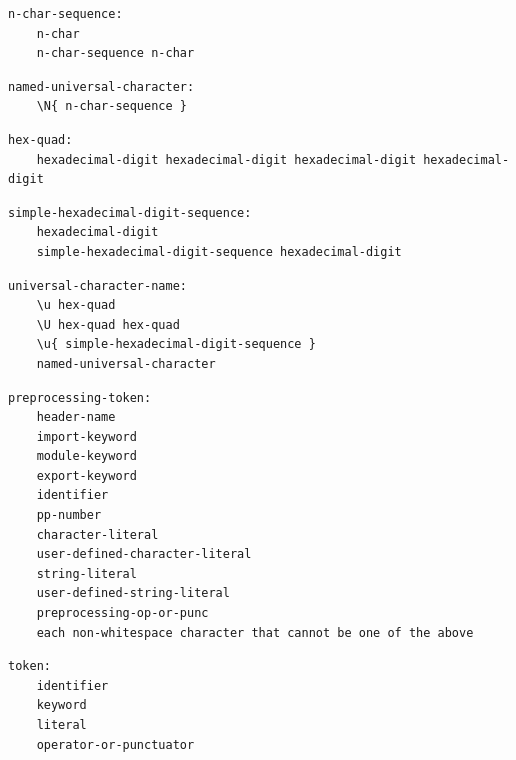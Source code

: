 \noindent\textbf{\texttt{}}\par
\begin{lstlisting}
n-char-sequence:
    n-char
    n-char-sequence n-char
\end{lstlisting}

\noindent\textbf{\texttt{}}\par
\begin{lstlisting}
named-universal-character:
    \N{ n-char-sequence }
\end{lstlisting}

\noindent\textbf{\texttt{}}\par
\begin{lstlisting}
hex-quad:
    hexadecimal-digit hexadecimal-digit hexadecimal-digit hexadecimal-digit
\end{lstlisting}

\noindent\textbf{\texttt{}}\par
\begin{lstlisting}
simple-hexadecimal-digit-sequence:
    hexadecimal-digit
    simple-hexadecimal-digit-sequence hexadecimal-digit
\end{lstlisting}

\noindent\textbf{\texttt{}}\par
\begin{lstlisting}
universal-character-name:
    \u hex-quad
    \U hex-quad hex-quad
    \u{ simple-hexadecimal-digit-sequence }
    named-universal-character
\end{lstlisting}

\noindent\textbf{\texttt{}}\par
\begin{lstlisting}
preprocessing-token:
    header-name
    import-keyword
    module-keyword
    export-keyword
    identifier
    pp-number
    character-literal
    user-defined-character-literal
    string-literal
    user-defined-string-literal
    preprocessing-op-or-punc
    each non-whitespace character that cannot be one of the above
\end{lstlisting}

\noindent\textbf{\texttt{}}\par
\begin{lstlisting}
token:
    identifier
    keyword
    literal
    operator-or-punctuator
\end{lstlisting}

